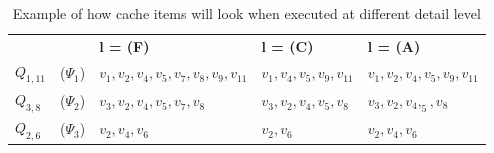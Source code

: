 \begin{table}
\begin{tabular}{@{}l@{}l@{}|@{}l@{}|@{}l@{}|@{}l@{}|@{}}\cline{3-5}
			&		& \bf l = (F)				& \bf l = (C)			& \bf l = (A) \\\cline{3-5}
$Q_{1,11}$		& ($\Psi_1$)	& $v_1,v_2,v_4,v_5,v_7,v_8,v_9,v_{11}$ 	& $v_1,v_4,v_5,v_9,v_{11}$ 	& $v_1,v_2,v_4,v_5,v_9,v_{11}$\\\cline{3-5}
$Q_{3,8}$		& ($\Psi_2$)	& $v_3,v_2,v_4,v_5,v_7,v_8$		& $v_3,v_2,v_4,v_5,v_8$ 	& $v_3,v_2,v_4,_5,v_8$\\\cline{3-5}
$Q_{2,6}$		& ($\Psi_3$)	& $v_2,v_4,v_6$				& $v_2,v_6$			& $v_2,v_4,v_6$\\\cline{3-5}
\end{tabular}
  \caption{Example of how cache items will look when executed at different detail level}
  \label{tab:psilvlcontent}
\end{table}

